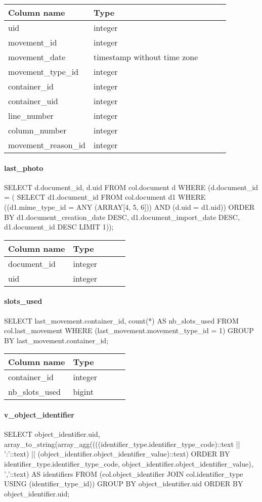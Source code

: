 \begin{tabular}{|l| p{2cm}|c|c| p{5cm}|}
\hline
Column name & Type \\
\hline
uid & integer\\
movement\_id & integer\\
movement\_date & timestamp without time zone\\
movement\_type\_id & integer\\
container\_id & integer\\
container\_uid & integer\\
line\_number & integer\\
column\_number & integer\\
movement\_reason\_id & integer\\
\hline
\end{tabular}
\paragraph{last\_photo}
 SELECT d.document\_id,
    d.uid
   FROM col.document d
  WHERE (d.document\_id = ( SELECT d1.document\_id
           FROM col.document d1
          WHERE ((d1.mime\_type\_id = ANY (ARRAY[4, 5, 6])) AND (d.uid = d1.uid))
          ORDER BY d1.document\_creation\_date DESC, d1.document\_import\_date DESC, d1.document\_id DESC
         LIMIT 1));

\begin{tabular}{|l| p{2cm}|c|c| p{5cm}|}
\hline
Column name & Type \\
\hline
document\_id & integer\\
uid & integer\\
\hline
\end{tabular}
\paragraph{slots\_used}
 SELECT last\_movement.container\_id,
    count(*) AS nb\_slots\_used
   FROM col.last\_movement
  WHERE (last\_movement.movement\_type\_id = 1)
  GROUP BY last\_movement.container\_id;

\begin{tabular}{|l| p{2cm}|c|c| p{5cm}|}
\hline
Column name & Type \\
\hline
container\_id & integer\\
nb\_slots\_used & bigint\\
\hline
\end{tabular}
\paragraph{v\_object\_identifier}
 SELECT object\_identifier.uid,
    array\_to\_string(array\_agg((((identifier\_type.identifier\_type\_code)::text || ':'::text) || (object\_identifier.object\_identifier\_value)::text) ORDER BY identifier\_type.identifier\_type\_code, object\_identifier.object\_identifier\_value), ','::text) AS identifiers
   FROM (col.object\_identifier
     JOIN col.identifier\_type USING (identifier\_type\_id))
  GROUP BY object\_identifier.uid
  ORDER BY object\_identifier.uid;

